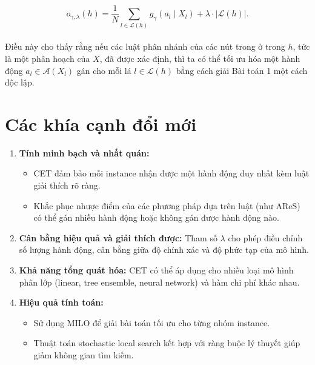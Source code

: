 \[
o_{\gamma, \lambda}(h) = \frac{1}{N} \sum_{l \in \mathcal{L}(h)} g_{\gamma}(a_l \mid X_l) + \lambda \cdot |\mathcal{L}(h)|.
\]

\paragraph{} Điều này cho thấy rằng nếu các luật phân nhánh của các nút trong ở trong \(h\), tức là một phân hoạch của \(X\), đã được xác định, thì ta có thể tối ưu hóa một hành động \(a_l \in \mathcal{A}(X_l)\) gán cho mỗi lá \(l \in \mathcal{L}(h)\) bằng cách giải Bài toán 1 một cách độc lập.

\section{Các khía cạnh đổi mới}

\begin{enumerate}
    \item \textbf{Tính minh bạch và nhất quán:}
    \begin{itemize}
        \item CET đảm bảo mỗi instance nhận được một hành động duy nhất kèm luật giải thích rõ ràng.
        \item Khắc phục nhược điểm của các phương pháp dựa trên luật (như AReS) có thể gán nhiều hành động hoặc không gán được hành động nào.
    \end{itemize}
    \item \textbf{Cân bằng hiệu quả và giải thích được:} Tham số $\lambda$ cho phép điều chỉnh số lượng hành động, cân bằng giữa độ chính xác và độ phức tạp của mô hình.
    \item \textbf{Khả năng tổng quát hóa:} CET có thể áp dụng cho nhiều loại mô hình phân lớp (linear, tree ensemble, neural network) và hàm chi phí khác nhau.
    \item \textbf{Hiệu quả tính toán:}
    \begin{itemize}
        \item Sử dụng MILO để giải bài toán tối ưu cho từng nhóm instance.
        \item Thuật toán stochastic local search kết hợp với ràng buộc lý thuyết giúp giảm không gian tìm kiếm.
    \end{itemize}
\end{enumerate}
